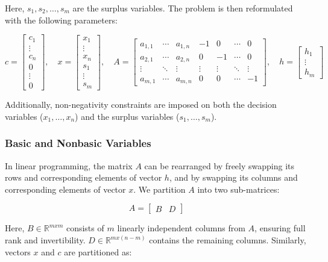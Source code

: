 \documentclass[unicode,11pt,a4paper,oneside,numbers=endperiod,openany]{scrartcl}
\begin{document}
Here, \(s_1, s_2, \ldots, s_m\) are the surplus variables. The problem is then reformulated with the following parameters:

\[
c = \begin{bmatrix}
c_1 \\ \vdots \\ c_n \\ 0 \\ \vdots \\ 0
\end{bmatrix},
\quad
x = \begin{bmatrix}
x_1 \\ \vdots \\ x_n \\ s_1 \\ \vdots \\ s_m
\end{bmatrix},
\quad
A = \begin{bmatrix}
a_{1,1} & \cdots & a_{1,n} & -1 & 0 & \cdots & 0 \\
a_{2,1} & \cdots & a_{2,n} & 0 & -1 & \cdots & 0 \\
\vdots & \ddots & \vdots & \vdots & \vdots & \ddots & \vdots \\
a_{m,1} & \cdots & a_{m,n} & 0 & 0 & \cdots & -1
\end{bmatrix},
\quad
h = \begin{bmatrix}
h_1 \\ \vdots \\ h_m
\end{bmatrix}
\]

Additionally, non-negativity constraints are imposed on both the decision variables (\(x_1, \ldots, x_n\)) and the surplus variables (\(s_1, \ldots, s_m\)).

\subsubsection{Basic and Nonbasic Variables}
In linear programming, the matrix \( A \) can be rearranged by freely swapping its rows and corresponding elements of vector \( h \), and by swapping its columns and corresponding elements of vector \( x \). We partition \( A \) into two sub-matrices:

\[
A = \begin{bmatrix}
    B & D
\end{bmatrix}
\]

Here, \( B \in \mathbb{R}^{mxm} \) consists of \( m \) linearly independent columns from \( A \), ensuring full rank and invertibility. \( D \in \mathbb{R}^{mx(n-m)} \) contains the remaining columns. Similarly, vectors \( x \) and \( c \) are partitioned as:
\end{document}

